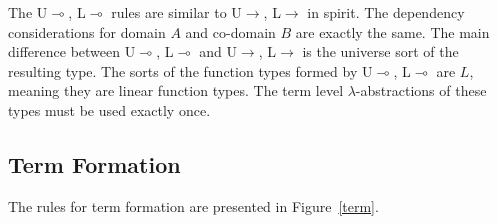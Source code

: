\documentclass[sigplan,screen,review,authordraft]{acmart}
\newcommand{\rname}[1]{\textsc{\footnotesize #1}}
\begin{document}
The \rname{U$\multimap$}, \rname{L$\multimap$} rules are similar to \rname{U$\rightarrow$}, \rname{L$\rightarrow$} in spirit. The dependency considerations for domain $A$ and co-domain $B$ are exactly the same. The main difference between \rname{U$\multimap$}, \rname{L$\multimap$} and \rname{U$\rightarrow$}, \rname{L$\rightarrow$} is the universe sort of the resulting type. The sorts of the function types formed by \rname{U$\multimap$}, \rname{L$\multimap$} are $L$, meaning they are linear function types. The term level $\lambda$-abstractions of these types must be used exactly once.

\subsection{Term Formation} \label{teformation}
The rules for term formation are presented in Figure~\ref{term}.
\end{document}
